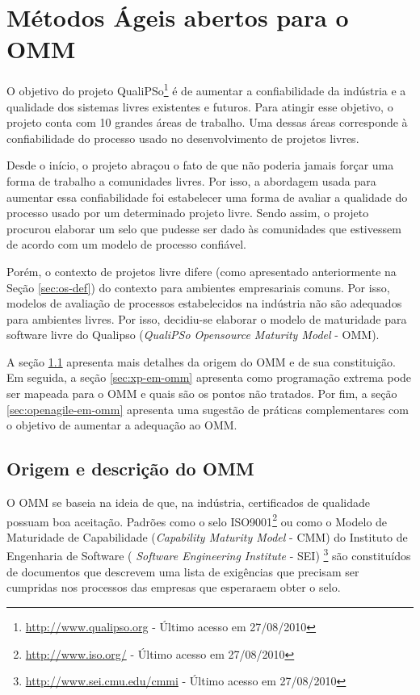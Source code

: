\chapter{Métodos Ágeis abertos para o OMM}
\label{cap:omm}

O objetivo do projeto QualiPSo\footnote{\url{http://www.qualipso.org}
  - Último acesso em 27/08/2010} é de aumentar a confiabilidade da
indústria e a qualidade dos sistemas livres existentes e futuros. Para
atingir esse objetivo, o projeto conta com 10 grandes áreas de
trabalho. Uma dessas áreas corresponde à confiabilidade do processo
usado no desenvolvimento de projetos livres.

Desde o início, o projeto abraçou o fato de que não poderia jamais
forçar uma forma de trabalho a comunidades livres. Por isso, a
abordagem usada para aumentar essa confiabilidade foi estabelecer uma
forma de avaliar a qualidade do processo usado por um determinado
projeto livre. Sendo assim, o projeto procurou elaborar um selo que
pudesse ser dado às comunidades que estivessem de acordo com um modelo
de processo confiável.

Porém, o contexto de projetos livre difere (como apresentado
anteriormente na Seção \ref{sec:os-def}) do contexto para ambientes
empresariais comuns. Por isso, modelos de avaliação de processos
estabelecidos na indústria não são adequados para ambientes
livres. Por isso, decidiu-se elaborar o modelo de maturidade para
software livre do Qualipso (\textit{QualiPSo Opensource Maturity
  Model} - OMM).

A seção \ref{sec:o-que-eh-omm} apresenta mais detalhes da origem do
OMM e de sua constituição. Em seguida, a seção \ref{sec:xp-em-omm}
apresenta como programação extrema pode ser mapeada para o OMM e quais
são os pontos não tratados. Por fim, a seção
\ref{sec:openagile-em-omm} apresenta uma sugestão de práticas
complementares com o objetivo de aumentar a adequação ao OMM.

\section{Origem e descrição do OMM}
\label{sec:o-que-eh-omm}

O OMM se baseia na ideia de que, na indústria, certificados de
qualidade possuam boa aceitação. Padrões como o selo
ISO9001\footnote{\url{http://www.iso.org/} - Último acesso em
  27/08/2010} ou como o Modelo de Maturidade de Capabilidade
(\textit{Capability Maturity Model} - CMM) do Instituto de Engenharia
de Software ( \textit{Software Engineering Institute} - SEI)
\footnote{\url{http://www.sei.cmu.edu/cmmi} - Último acesso em
  27/08/2010} são constituídos de documentos que descrevem uma lista
de exigências que precisam ser cumpridas nos processos das empresas
que esperaraem obter o selo.

